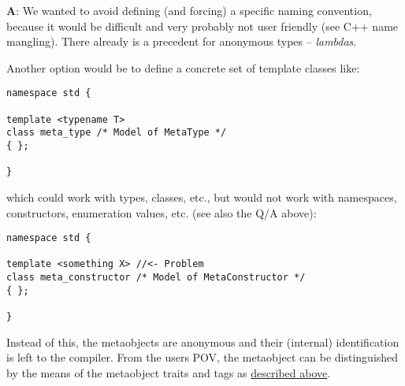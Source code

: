 {\textbf A:} We wanted to avoid defining (and forcing) a specific naming convention, because
it would be difficult and very probably not user friendly (see C++ name mangling). There
already is a precedent for anonymous types -- {\em lambdas}.

Another option would be to define a concrete set of template classes like:

\begin{verbatim}
namespace std {

template <typename T>
class meta_type /* Model of MetaType */
{ };

}
\end{verbatim}

which could work with types, classes, etc., but would not work with namespaces, constructors,
enumeration values, etc. (see also the Q/A above):

\begin{verbatim}
namespace std {

template <something X> //<- Problem
class meta_constructor /* Model of MetaConstructor */
{ };

}
\end{verbatim}

Instead of this, the metaobjects are anonymous and their (internal) identification
is left to the compiler. From the users POV, the metaobject can be distinguished
by the means of the metaobject traits and tags as \hyperref[section-Concepts]{described above}.
